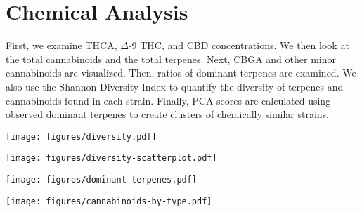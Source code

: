 \documentclass[../article.tex, 12pt]{subfiles}
\begin{document}
%
%


\newpage
\section*{Chemical Analysis}
\label{sec:Chemical Analysis}
\thispagestyle{regular}
%
First, we examine THCA, $\Delta$-9 THC, and CBD concentrations. We then look at the total cannabinoids and the total terpenes. Next, CBGA and other minor cannabinoids are visualized. Then, ratios of dominant terpenes are examined. We also use the Shannon Diversity Index to quantify the diversity of terpenes and cannabinoids found in each strain. Finally, PCA scores are calculated using observed dominant terpenes to create clusters of chemically similar strains.


\vspace{1\baselineskip}

\begin{center}
\texttt{[image: figures/diversity.pdf]}
\end{center}

\vspace{2\baselineskip}

\texttt{[image: figures/diversity-scatterplot.pdf]}

\vspace{2\baselineskip}

{\tiny
\vspace{1\baselineskip}

}

\texttt{[image: figures/dominant-terpenes.pdf]}

\vspace{2\baselineskip}

\texttt{[image: figures/cannabinoids-by-type.pdf]}

\vspace{2\baselineskip}
\end{document}
